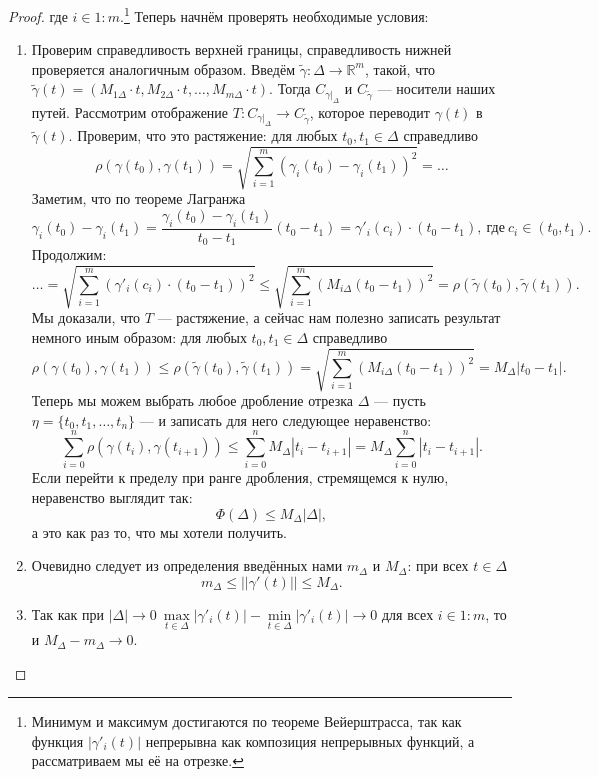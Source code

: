 \begin{proof}
	
	где \(i \in 1 : m\).\footnote{Минимум и максимум достигаются по теореме Вейерштрасса, так как функция \(|\gamma'_i(t)|\) непрерывна как композиция непрерывных функций, а рассматриваем мы её на отрезке.} Теперь начнём проверять необходимые условия:
	\begin{enumerate}
		\item Проверим справедливость верхней границы, справедливость нижней проверяется аналогичным образом. Введём \(\widetilde{\gamma} \colon \Delta \to \mathbb{R}^m\), такой, что \(\widetilde{\gamma}(t) = (M_{1\Delta} \cdot t, M_{2\Delta} \cdot t, \ldots, M_{m\Delta} \cdot t)\). Тогда \(C_{\gamma |_\Delta}\) и \(C_{\widetilde{\gamma}}\) --- носители наших путей. Рассмотрим отображение \(T \colon C_{\gamma |_\Delta} \to C_{\widetilde{\gamma}}\), которое переводит \(\gamma(t)\) в \(\widetilde{\gamma}(t)\). Проверим, что это растяжение: для любых  \(t_0, t_1 \in \Delta\) справедливо \[
		\rho(\gamma(t_0), \gamma(t_1)) =  \sqrt{\sum\limits_{i = 1}^m (\gamma_i (t_0) - \gamma_i (t_1))^2} = \ldots
		\]
		Заметим, что по теореме Лагранжа \[
		\gamma_i (t_0) - \gamma_i (t_1) = \frac{\gamma_i (t_0) - \gamma_i (t_1)}{t_0 - t_1} (t_0 - t_1) = \gamma'_i(c_i) \cdot (t_0 - t_1), \ \text{где} \ c_i \in (t_0, t_1).
		\]
		Продолжим: \[
		\ldots =  \sqrt{\sum\limits_{i = 1}^m (\gamma'_i(c_i) \cdot (t_0 - t_1))^2} \leqslant \sqrt{\sum\limits_{i = 1}^m (M_{i\Delta} (t_0 - t_1) )^2} = \rho(\widetilde{\gamma}(t_0), \widetilde{\gamma}(t_1)).
		\]
		Мы доказали, что \(T\) --- растяжение, а сейчас нам полезно записать результат немного иным образом: для любых \(t_0, t_1 \in \Delta\) справедливо \[
		\rho(\gamma(t_0), \gamma(t_1)) \leqslant \rho(\widetilde{\gamma}(t_0), \widetilde{\gamma}(t_1)) = \sqrt{\sum\limits_{i = 1}^m (M_{i\Delta} (t_0 - t_1) )^2} = M_\Delta |t_0 - t_1|.
		\]
		Теперь мы можем выбрать любое дробление отрезка \(\Delta\) --- пусть \(\eta = \{t_0, t_1, \ldots, t_n\}\) --- и записать для него следующее неравенство: \[
		\sum_{i = 0}^n \rho(\gamma(t_i), \gamma(t_{i + 1})) \leqslant \sum_{i = 0}^n M_\Delta |t_i - t_{i + 1}| = M_\Delta \sum_{i = 0}^n |t_i - t_{i + 1}|.
		\]
		Если перейти к пределу при ранге дробления, стремящемся к нулю, неравенство выглядит так: \[
		\Phi(\Delta) \leqslant M_\Delta |\Delta|,
		\]
		а это как раз то, что мы хотели получить.
		\item Очевидно следует из определения введённых нами \(m_\Delta\) и \(M_\Delta\): при всех \(t \in \Delta\) \[
		m_\Delta \leqslant ||\gamma'(t)||\leqslant M_\Delta.
		\]
		\item Так как при \(|\Delta| \to 0 \ \max\limits_{t \in \Delta} |\gamma'_i (t)| - \min\limits_{t \in \Delta} |\gamma'_i (t)| \to 0\) для всех \(i \in 1 : m\), то и \(M_\Delta - m_\Delta \to 0\).
	\end{enumerate}
\end{proof}

